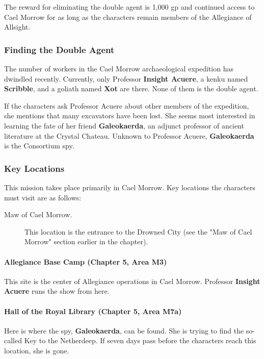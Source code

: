 \documentclass[a4paper, 11pt, bg=full, twocolumn, nooutline]{dndbook}
\begin{document}
The reward for eliminating the double agent is 1,000 gp and continued access to Cael Morrow for as long as the characters remain members of the Allegiance of Allsight.

\subsubsection{Finding the Double Agent}

The number of workers in the Cael Morrow archaeological expedition has dwindled recently. Currently, only Professor \textbf{Insight Acuere}, a kenku named \textbf{Scribble}, and a goliath named \textbf{Xot} are there. None of them is the double agent.

If the characters ask Professor Acuere about other members of the expedition, she mentions that many excavators have been lost. She seems most interested in learning the fate of her friend \textbf{Galeokaerda}, an adjunct professor of ancient literature at the Crystal Chateau. Unknown to Professor Acuere, \textbf{Galeokaerda} is the Consortium spy.

\subsubsection{Key Locations}

This mission takes place primarily in Cael Morrow. Key locations the characters must visit are as follows:

\begin{description}
\item[Maw of Cael Morrow.] This location is the entrance to the Drowned City (see the "Maw of Cael Morrow" section earlier in the chapter).
\end{description}

\paragraph{Allegiance Base Camp (Chapter 5, Area M3)}

This site is the center of Allegiance operations in Cael Morrow. Professor \textbf{Insight Acuere} runs the show from here.

\paragraph{Hall of the Royal Library (Chapter 5, Area M7a)}

Here is where the spy, \textbf{Galeokaerda}, can be found. She is trying to find the so-called Key to the Netherdeep. If seven days pass before the characters reach this location, she is gone.
\end{document}
